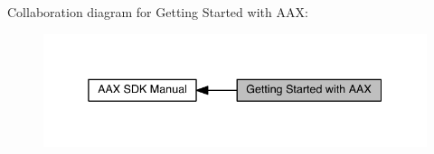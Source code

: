  Collaboration diagram for Getting Started with A\+A\+X\+:
\nopagebreak
\begin{figure}[H]
\begin{center}
\leavevmode
\includegraphics[width=338pt]{a00324}
\end{center}
\end{figure}

